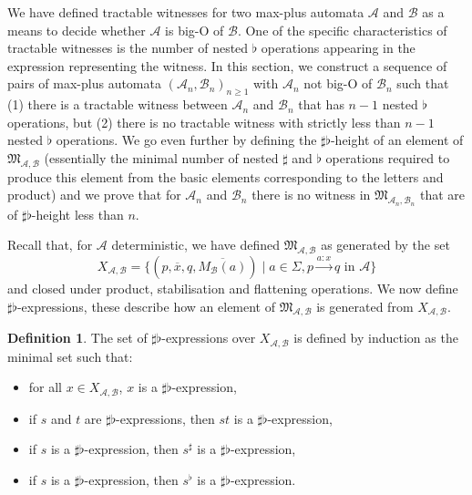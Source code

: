 \documentclass[10pt,a4paper]{amsart}
\theoremstyle{definition}
\newtheorem{defi}[defi]{Definition}
\numberwithin{equation}{section}
\theoremstyle{remark}
\newcommand{\ideal}{\mathfrak{M}}
\newcommand{\autA}{\mathcal{A}}
\newcommand{\autB}{\mathcal{B}}
\theoremstyle{remark}
\begin{document}
We have defined tractable witnesses for two max-plus automata $\autA$ and $\autB$ as a means to decide whether $\autA$ is big-O of $\autB$. One of the specific characteristics of tractable witnesses is the number of nested $\flat$ operations appearing in the expression representing the witness. In this section, we construct a sequence of pairs of max-plus automata $(\autA_n, \autB_n)_{n\geq 1}$ with $\autA_n$ not big-O of $\autB_n$ such that (1) there is a tractable witness between $\autA_n$ and $\autB_n$ that has $n-1$ nested $\flat$ operations, but (2) there is no tractable witness with strictly less than $n-1$ nested $\flat$ operations. We go even further by defining the $\sharp\flat$-height of an element of $\ideal_{\autA,\autB}$ (essentially the minimal number of nested $\sharp$ and $\flat$ operations required to produce this element from the basic elements corresponding to the letters and product) and we prove that for $\autA_n$ and $\autB_n$ there is no witness in $\ideal_{\autA_n,\autB_n}$ that are of $\sharp\flat$-height less than $n$. 

Recall that, for $\autA$ deterministic, we have defined $\ideal_{\autA,\autB}$ as generated by the set 
$$X_{\autA, \autB} = \{(p,\overline{x},q,\overline{M_\autB(a)}) \mid a\in \Sigma, p\xrightarrow{a:x}q \text{ in } \autA\}$$ 
and closed under product, stabilisation and flattening operations. We now define $\sharp\flat$-expressions, these describe how an element of $\ideal_{\autA,\autB}$ is generated from $X_{\autA, \autB}$.

\begin{defi}
The set of $\sharp\flat$-expressions over $X_{\autA, \autB}$ is defined by induction as the minimal set such that:
\begin{itemize}
\item for all $x \in X_{\autA, \autB}$, $x$ is a $\sharp\flat$-expression,
\item if $s$ and $t$ are $\sharp\flat$-expressions, then $st$ is a $\sharp\flat$-expression,
\item if $s$ is a $\sharp\flat$-expression, then $s^\sharp$ is a $\sharp\flat$-expression,
\item if $s$ is a $\sharp\flat$-expression, then $s^\flat$ is a $\sharp\flat$-expression.
\end{itemize} 
\end{defi}
\end{document}
